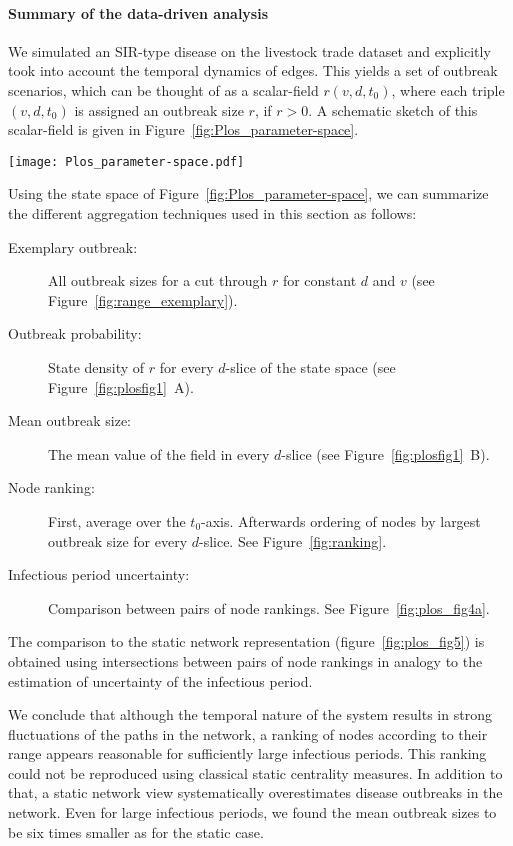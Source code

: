 \paragraph{Summary of the data-driven analysis\color{Cayenne}{.}}
We simulated an SIR-type disease on the livestock trade dataset and explicitly took into account the temporal dynamics of edges.
This yields a set of outbreak scenarios, which can be thought of as a scalar-field $r(v,d,t_0)$, where each triple $(v,d,t_0)$ is assigned an outbreak size $r$, if $r>0$.
A schematic sketch of this scalar-field is given in Figure~\ref{fig:Plos_parameter-space}.
%
\begin{SCfigure}
\texttt{[image: Plos\_parameter-space.pdf]}
\caption{Scalar field representing the set of outbreak scenarios as defined in \eqref{eq:outbreak_set}.
Each combination of starting node $v$, starting time $t_0$ and infectious period $d$ yields an outbreak size $r(v,d,t_0)$.
The domain is bounded as defined in \eqref{eq:outbreak_set}.}
\label{fig:Plos_parameter-space}
\end{SCfigure}
%
Using the state space of Figure~\ref{fig:Plos_parameter-space}, we can summarize the different aggregation techniques used in this section as follows:
\begin{description}
\item [Exemplary outbreak:] All outbreak sizes for a cut through $r$ for constant $d$ and $v$ (see Figure~\ref{fig:range_exemplary}).
\item [Outbreak probability:] State density of $r$ for every $d$-slice of the state space (see Figure~\ref{fig:plosfig1}~A).
\item [Mean outbreak size:] The mean value of the field in every $d$-slice (see Figure~\ref{fig:plosfig1}~B).
\item [Node ranking:] First, average over the $t_0$-axis. Afterwards ordering of nodes by largest outbreak size for every $d$-slice. See Figure~\ref{fig:ranking}.
\item [Infectious period uncertainty:] Comparison between pairs of node rankings. See Figure~\ref{fig:plos_fig4a}.
\end{description}
%
The comparison to the static network representation (figure~\ref{fig:plos_fig5}) is obtained using intersections between pairs of node rankings in analogy to the estimation of uncertainty of the infectious period.

We conclude that although the temporal nature of the system results in strong fluctuations of the paths in the network, a ranking of nodes according to their range appears reasonable for sufficiently large infectious periods.
This ranking could not be reproduced using classical static centrality measures.
In addition to that, a static network view systematically overestimates disease outbreaks in the network.
Even for large infectious periods, we found the mean outbreak sizes to be six times smaller as for the static case.

